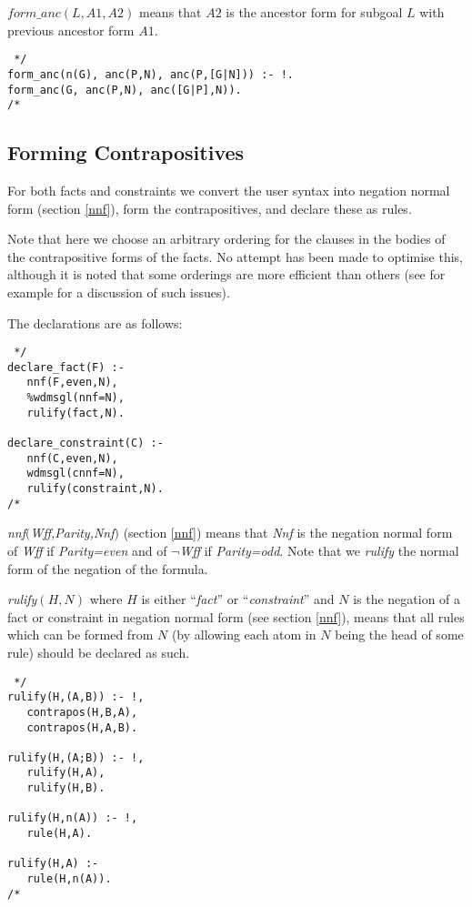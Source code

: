 $form\_anc(L,A1,A2)$ means that $A2$ is the ancestor form for
subgoal $L$ with previous ancestor form $A1$.

\begin{verbatim} */
form_anc(n(G), anc(P,N), anc(P,[G|N])) :- !.
form_anc(G, anc(P,N), anc([G|P],N)).
/* \end{verbatim}
\subsection{Forming Contrapositives}
For both facts and constraints we convert the user
syntax into negation normal
form (section \ref{nnf}), form the contrapositives,
and declare these as rules.

Note that here we choose an arbitrary ordering for the clauses
in the bodies of the contrapositive forms of the facts. No
attempt has been made to optimise this, although it is noted that some
orderings are more efficient than others (see for example \cite{smith86}
for a discussion of such issues).

The declarations are as follows:
\begin{verbatim} */
declare_fact(F) :-
   nnf(F,even,N),
   %wdmsgl(nnf=N),
   rulify(fact,N).

declare_constraint(C) :-
   nnf(C,even,N),
   wdmsgl(cnnf=N),
   rulify(constraint,N).
/* \end{verbatim}

{\em nnf\/$($Wff,Parity,Nnf\/$)$} (section \ref{nnf})
means that {\em Nnf\/} is the negation normal form
of {\em Wff} if {\em Parity=even} and of $\neg${\em Wff}
if {\em Parity=odd}. Note that we {\em rulify} the normal form
of the negation of the formula.

{\em rulify\/}$(H,N)$ where $H$ is
either ``{\em fact\/}'' or ``{\em constraint\/}''
and $N$ is the negation of a fact or constraint
in negation normal form (see section \ref{nnf}),
means that all rules which can be formed from $N$ (by allowing each
atom in $N$ being the head of some rule) should be declared as such.
\begin{verbatim} */
rulify(H,(A,B)) :- !,
   contrapos(H,B,A),
   contrapos(H,A,B).

rulify(H,(A;B)) :- !,
   rulify(H,A),
   rulify(H,B).

rulify(H,n(A)) :- !,
   rule(H,A).

rulify(H,A) :-
   rule(H,n(A)).
/* \end{verbatim}

